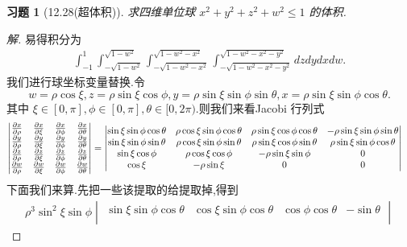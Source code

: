 \documentclass[a4paper, 12pt]{article} %
\newtheorem*{cdtheorem}{习题}
\newenvironment{exercise}
{\bigskip\begin{mdframed}[backgroundcolor=gray!40,rightline=false,leftline=false,topline=false,bottomline=false]\begin{cdtheorem}}
    {\end{cdtheorem}\end{mdframed}\bigskip}
\begin{document}
\begin{CJK}{UTF8}{gkai}
  \begin{exercise}[12.28(超体积)]
    求四维单位球 $x^2+y^2+z^2+w^2\leq 1$ 的体积.
  \end{exercise}
  \begin{proof}[解]
    易得积分为
    \begin{align*}
      \int_{-1}^1\int_{-\sqrt{1-w^2}}^{\sqrt{1-w^2}}\int_{-\sqrt{1-w^2-x^2}}^{\sqrt{1-w^2-x^2}}\int_{-\sqrt{1-w^2-x^2-y^2}}^{\sqrt{1-w^2-x^2-y^2}}dzdydxdw.
    \end{align*}
    我们进行球坐标变量替换.令
$$
w=\rho\cos\xi,z=\rho\sin\xi\cos\phi,y=\rho\sin\xi\sin\phi\sin\theta,x=\rho\sin\xi\sin\phi\cos\theta.
$$
其中 $\xi\in [0,\pi],\phi\in [0,\pi],\theta\in [0,2\pi)$.则我们来看Jacobi 行列式
\begin{align*}
  \begin{vmatrix}
    \frac{\partial x}{\partial \rho}&\frac{\partial x}{\partial \xi}&\frac{\partial x}{\partial
      \phi}&\frac{\partial x}{\partial\theta}\\
    \frac{\partial y}{\partial \rho}&\frac{\partial y}{\partial \xi}&\frac{\partial y}{\partial
      \phi}&\frac{\partial y}{\partial\theta}\\
    \frac{\partial z}{\partial \rho}&\frac{\partial z}{\partial \xi}&\frac{\partial z}{\partial
      \phi}&\frac{\partial z}{\partial\theta}\\
    \frac{\partial w}{\partial \rho}&\frac{\partial w}{\partial \xi}&\frac{\partial w}{\partial
      \phi}&\frac{\partial w}{\partial\theta}\\
  \end{vmatrix}&=\begin{vmatrix}
    \sin\xi\sin\phi\cos\theta&\rho\cos\xi\sin\phi\cos\theta&\rho\sin\xi\cos\phi\cos\theta&-\rho\sin\xi\sin\phi\sin\theta\\
    \sin\xi\sin\phi\sin\theta&\rho\cos\xi\sin\phi\sin\theta&\rho\sin\xi\cos\phi\sin\theta&\rho\sin\xi\sin\phi\cos\theta\\
    \sin\xi\cos\phi&\rho\cos\xi\cos\phi&-\rho\sin\xi\sin\phi&0\\
    \cos\xi&-\rho\sin\xi&0&0\\
  \end{vmatrix}
\end{align*}
下面我们来算.先把一些该提取的给提取掉,得到
\begin{align*}
  \rho^3\sin^2\xi\sin\phi
  \begin{vmatrix}
    \sin\xi\sin\phi\cos\theta&\cos\xi\sin\phi\cos\theta&\cos\phi\cos\theta&-\sin\theta\\

\end{vmatrix}
\end{align*}
\end{proof}
\end{CJK}
\end{document}
